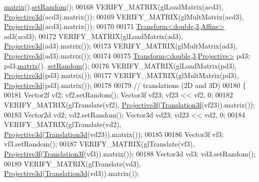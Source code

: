 \begin{DoxyCode}
      \hyperlink{group___geometry___module_aec8168000a88a807130d41020af98d47}{matrix}().\hyperlink{class_eigen_1_1_plain_object_base_af0e576a0e1aefc9ee346de44cc352ba3}{setRandom}();
00168   VERIFY\_MATRIX(glLoadMatrix(acd3), \hyperlink{group___geometry___module_gab9cec8c457da930391eb73370e07aaae}{Projective3d}(acd3).matrix());
00169   VERIFY\_MATRIX(glMultMatrix(acd3), \hyperlink{group___geometry___module_gab9cec8c457da930391eb73370e07aaae}{Projective3d}(acd3).matrix());
00170   
00171   \hyperlink{group___geometry___module_class_eigen_1_1_transform}{Transform<double,3,Affine>} ad3(acd3);
00172   VERIFY\_MATRIX(glLoadMatrix(ad3), \hyperlink{group___geometry___module_gab9cec8c457da930391eb73370e07aaae}{Projective3d}(ad3).matrix());
00173   VERIFY\_MATRIX(glMultMatrix(ad3), \hyperlink{group___geometry___module_gab9cec8c457da930391eb73370e07aaae}{Projective3d}(ad3).matrix());
00174   
00175   \hyperlink{group___geometry___module_class_eigen_1_1_transform}{Transform<double,3,Projective>} pd3; pd3.\hyperlink{group___geometry___module_aec8168000a88a807130d41020af98d47}{matrix}().
      \hyperlink{class_eigen_1_1_plain_object_base_af0e576a0e1aefc9ee346de44cc352ba3}{setRandom}();
00176   VERIFY\_MATRIX(glLoadMatrix(pd3), \hyperlink{group___geometry___module_gab9cec8c457da930391eb73370e07aaae}{Projective3d}(pd3).matrix());
00177   VERIFY\_MATRIX(glMultMatrix(pd3), \hyperlink{group___geometry___module_gab9cec8c457da930391eb73370e07aaae}{Projective3d}(pd3).matrix());
00178   
00179   \textcolor{comment}{// translations (2D and 3D)}
00180   \{
00181     Vector2f vf2; vf2.setRandom(); Vector3f vf23; vf23 << vf2, 0;
00182     VERIFY\_MATRIX(glTranslate(vf2), \hyperlink{group___geometry___module_gab14804071b7486b6666f3d324475a478}{Projective3f}(\hyperlink{group___geometry___module_class_eigen_1_1_translation}{Translation3f}(vf23)).matrix());
00183     Vector2d vd2; vd2.setRandom(); Vector3d vd23; vd23 << vd2, 0;
00184     VERIFY\_MATRIX(glTranslate(vd2), \hyperlink{group___geometry___module_gab9cec8c457da930391eb73370e07aaae}{Projective3d}(\hyperlink{group___geometry___module_class_eigen_1_1_translation}{Translation3d}(vd23)).matrix());
00185     
00186     Vector3f vf3; vf3.setRandom();
00187     VERIFY\_MATRIX(glTranslate(vf3), \hyperlink{group___geometry___module_gab14804071b7486b6666f3d324475a478}{Projective3f}(\hyperlink{group___geometry___module_class_eigen_1_1_translation}{Translation3f}(vf3)).matrix());
00188     Vector3d vd3; vd3.setRandom();
00189     VERIFY\_MATRIX(glTranslate(vd3), \hyperlink{group___geometry___module_gab9cec8c457da930391eb73370e07aaae}{Projective3d}(\hyperlink{group___geometry___module_class_eigen_1_1_translation}{Translation3d}(vd3)).matrix());

\end{DoxyCode}
